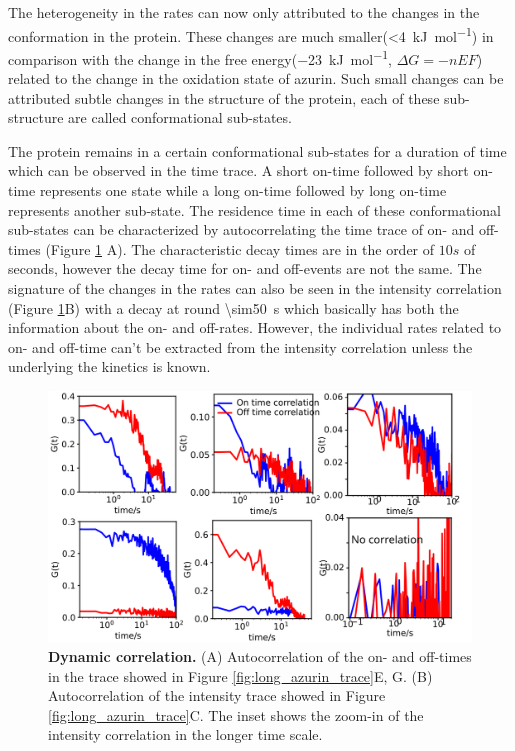 \documentclass[journal=jacsat,manuscript=article]{achemso}
\begin{document}
The heterogeneity in the rates can now only attributed to the changes in the conformation in the protein.
These changes are much smaller(\SI{<4}{\kJ\per\mole}) in comparison with the change in the free energy(\SI{-23}{\kJ\per\mole}, $\Delta{G}=-nEF$) related to the change in the oxidation state of azurin.
Such small changes can be attributed subtle changes in the structure of the protein, each of these sub-structure are called conformational sub-states.

The protein remains in a certain conformational sub-states for a duration of time which can be observed in the time trace.
A short on-time followed by short on-time represents one state while a long on-time followed by long on-time represents another sub-state.
The residence time in each of these conformational sub-states can be characterized by autocorrelating the time trace of on- and off-times (Figure \ref{fig:Dynamic_corr} A).
The characteristic decay times are in the order of $10s$ of seconds, however the decay time for on- and off-events are not the same.
The signature of the changes in the rates can also be seen in the intensity correlation (Figure \ref{fig:Dynamic_corr}B) with a decay at round \SI{\sim50}{\s} which basically has both the information about the on- and off-rates.
However, the individual rates related to on- and off-time can't be extracted from the intensity correlation unless the underlying the kinetics is known.
\begin{figure}
	\centering
	\includegraphics[width=\textwidth]{Dynamic_corr}
	\caption{\textbf{Dynamic correlation.} (A) Autocorrelation of the on- and off-times in the trace showed in Figure \ref{fig:long_azurin_trace}E, G. (B) Autocorrelation of the intensity trace showed in Figure \ref{fig:long_azurin_trace}C. The inset shows the zoom-in of the intensity correlation in the longer time scale.}
	\label{fig:Dynamic_corr}
\end{figure}
\end{document}
